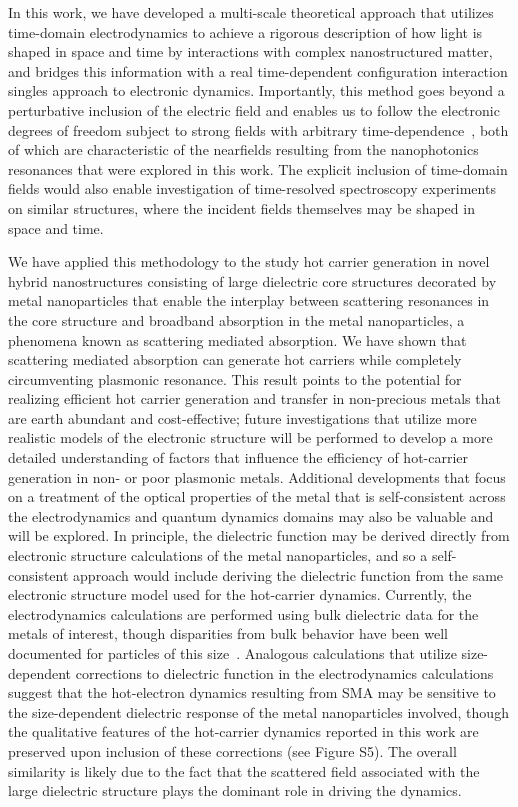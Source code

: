 \documentclass[journal=jpclcd,manuscript=article]{achemso}
\begin{document}
In this work, we have developed a multi-scale theoretical approach that utilizes time-domain electrodynamics to achieve a rigorous description of 
how light is shaped in space and time by interactions with complex nanostructured matter, and bridges this information with a real 
time-dependent configuration interaction singles approach to electronic dynamics.  Importantly, this method goes beyond a perturbative 
inclusion of the electric field and enables us to follow the electronic degrees of freedom subject to strong fields with 
arbitrary time-dependence~\cite{KKS_JCP_2005,GHP_PRA_2010,DPG_PRL_2011}, both of which are characteristic of the nearfields 
resulting from the nanophotonics resonances that were explored in this work.  The explicit inclusion of time-domain fields would 
also enable investigation of time-resolved spectroscopy experiments on similar structures, where the incident fields themselves may be shaped in space and time.  

We have applied this methodology to the study hot carrier generation in novel hybrid nanostructures consisting of large dielectric 
core structures decorated by metal nanoparticles that enable the interplay between scattering resonances in the core 
structure and broadband absorption in the metal nanoparticles, a phenomena known as scattering mediated absorption.  
We have shown that scattering mediated absorption can generate hot carriers while completely circumventing plasmonic resonance.  
This result points to the potential for realizing efficient hot carrier generation and transfer in non-precious metals that are 
earth abundant and cost-effective; future investigations that utilize
more realistic models of the electronic structure will be performed to develop a more detailed
understanding of factors that influence the efficiency of hot-carrier generation in non- or poor plasmonic metals.
Additional developments that focus on a treatment of the optical properties
of the metal that is self-consistent across the electrodynamics and quantum dynamics domains may also be valuable and will be explored.  In principle, the dielectric function may be derived directly from electronic structure calculations of
the metal nanoparticles, and so a self-consistent approach would include deriving the dielectric
function from the same electronic structure model used for the hot-carrier dynamics.  Currently, the electrodynamics
calculations are performed using bulk dielectric data for the metals of interest, though disparities
from bulk behavior have been well documented for particles of this size~\cite{KS_JCP_1983,CTP_3,SKD_Nature_2012,CTP}.
Analogous calculations that utilize size-dependent corrections to
dielectric function in the electrodynamics calculations suggest that the hot-electron dynamics
resulting from SMA may be sensitive to the size-dependent dielectric response of the metal nanoparticles involved,
though the qualitative features of the hot-carrier dynamics reported in this work
are preserved upon inclusion of these corrections (see Figure S5).  The overall similarity 
is likely due to the fact that the scattered field associated with the large dielectric
structure plays the dominant role in driving the dynamics.   
\end{document}
